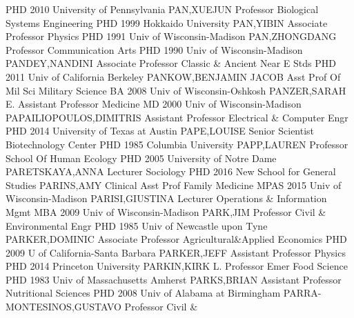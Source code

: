 \documentclass[
]{article}
\begin{document}
\textbar PHD 2010 University of Pennsylvania \textbar{} 
\textbar PAN,XUEJUN \textbar Professor \textbar Biological Systems
Engineering \textbar PHD 1999 Hokkaido University \textbar{}
 \textbar PAN,YIBIN \textbar Associate Professor
\textbar Physics \textbar PHD 1991 Univ of Wisconsin-Madison \textbar{}
 \textbar PAN,ZHONGDANG \textbar Professor
\textbar Communication Arts \textbar PHD 1990 Univ of Wisconsin-Madison
\textbar{}  \textbar PANDEY,NANDINI \textbar Associate
Professor \textbar Classic \& Ancient Near E Stds \textbar PHD 2011 Univ
of California Berkeley \textbar{}  \textbar PANKOW,BENJAMIN
JACOB \textbar Asst Prof Of Mil Sci \textbar Military Science
\textbar BA 2008 Univ of Wisconsin-Oshkosh \textbar{} 
\textbar PANZER,SARAH E. \textbar Assistant Professor \textbar Medicine
\textbar MD 2000 Univ of Wisconsin-Madison \textbar{} 
\textbar PAPAILIOPOULOS,DIMITRIS \textbar Assistant Professor
\textbar Electrical \& Computer Engr \textbar PHD 2014 University of
Texas at Austin \textbar{}  \textbar PAPE,LOUISE
\textbar Senior Scientist \textbar Biotechnology Center \textbar PHD
1985 Columbia University \textbar{}  \textbar PAPP,LAUREN
\textbar Professor \textbar School Of Human Ecology \textbar PHD 2005
University of Notre Dame \textbar{} 
\textbar PARETSKAYA,ANNA \textbar Lecturer \textbar Sociology
\textbar PHD 2016 New School for General Studies \textbar{} 
\textbar PARINS,AMY \textbar Clinical Asst Prof \textbar Family Medicine
\textbar MPAS 2015 Univ of Wisconsin-Madison \textbar{} 
\textbar PARISI,GIUSTINA \textbar Lecturer \textbar Operations \&
Information Mgmt \textbar MBA 2009 Univ of Wisconsin-Madison \textbar{}
 \textbar PARK,JIM \textbar Professor \textbar Civil \&
Environmental Engr \textbar PHD 1985 Univ of Newcastle upon Tyne
\textbar{}  \textbar PARKER,DOMINIC \textbar Associate
Professor \textbar Agricultural\&Applied Economics \textbar PHD 2009 U
of California-Santa Barbara \textbar{}  \textbar PARKER,JEFF
\textbar Assistant Professor \textbar Physics \textbar PHD 2014
Princeton University \textbar{}  \textbar PARKIN,KIRK L.
\textbar Professor Emer \textbar Food Science \textbar PHD 1983 Univ of
Massachusetts Amherst \textbar{}  \textbar PARKS,BRIAN
\textbar Assistant Professor \textbar Nutritional Sciences \textbar PHD
2008 Univ of Alabama at Birmingham \textbar{} 
\textbar PARRA-MONTESINOS,GUSTAVO \textbar Professor \textbar Civil \&
\end{document}
